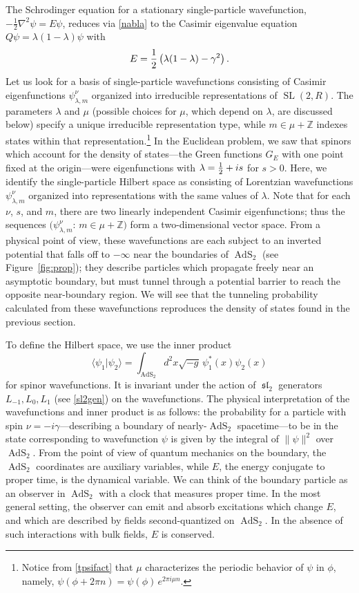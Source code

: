 \documentclass[11pt]{article}
\newcommand{\be}{\begin{equation}}
\newcommand{\ee}{\end{equation}}
\newcommand{\lt}{\left}
\newcommand{\rt}{\right}
\newcommand{\blangle}{\bigl\langle}
\newcommand{\brangle}{\bigr\rangle}
\newcommand*{\bbraket}[2]{\blangle{#1}\big|{#2}\brangle}
\newcommand{\ZZ}{\mathbb{Z}}
\newcommand{\RR}{\mathbb{R}}
\DeclareMathOperator{\sL}{\mathfrak{sl}}
\DeclareMathOperator{\tSL}{\widetilde{\mathrm{SL}}}
\DeclareMathOperator{\tAdS}{\widetilde{AdS}}
\newcommand{\lam}{\lambda}
\newcommand{\ga}{\gamma}
\newcommand{\ov}{\over}
\def\widetilde#1{#1}%
\def\RR{R}
\begin{document}
The Schrodinger equation for a stationary single-particle wavefunction, $-\frac{1}{2}\nabla^2\psi=E\psi$, reduces via \eqref{nabla} to the Casimir eigenvalue equation $Q\psi=\lam(1-\lam)\psi$ with
\be \label{EQrel}
E={1 \ov 2}\lt(\lam(1-\lam)-\ga^2\rt).
\ee
Let us look for a basis of single-particle wavefunctions consisting of Casimir eigenfunctions $\psi^{\nu}_{\lam, m}$ organized into irreducible representations of $\tSL(2,\RR)$. The parameters $\lambda$ and $\mu$ (possible choices for $\mu$, which depend on $\lam$, are discussed below) specify a unique irreducible representation type, while $m \in \mu+\ZZ$ indexes states within that representation.\footnote{Notice from \eqref{tpsifact} that $\mu$ characterizes the periodic behavior of $\psi$ in $\phi$, namely, $\psi(\phi+2\pi n)=\psi(\phi)\,e^{2\pi i\mu n}$.} In the Euclidean problem, we saw that spinors which account for the density of states---the Green functions $G_E$ with one point fixed at the origin---were eigenfunctions with $\lambda={1 \ov 2}+is$ for $s>0$. Here, we identify the single-particle Hilbert space as consisting of Lorentzian wavefunctions $\psi^{\nu}_{\lam, m}$ organized into representations with the same values of $\lam$. Note that for each $\nu$, $s$, and $m$, there are two linearly independent Casimir eigenfunctions; thus the sequences $\bigl(\psi^{\nu}_{\lam,m}:\, m\in\mu+\ZZ\bigr)$ form a two-dimensional vector space. From a physical point of view, these wavefunctions are each subject to an inverted potential that falls off to $-\infty$ near the boundaries of $\tAdS_2$ (see Figure~\ref{fig:prop}); they describe particles which propagate freely near an asymptotic boundary, but must tunnel through a potential barrier to reach the opposite near-boundary region. We will see that the tunneling probability calculated from these wavefunctions reproduces the density of states found in the previous section.

To define the Hilbert space, we use the inner product 
\begin{equation} \label{innprod}
\bbraket{\psi_1} {\psi_2}=\int_{\tAdS_2} d^2 x \sqrt{-g}\,\psi_1^*(x) \psi_2(x)
\end{equation}
for spinor wavefunctions. It is invariant under the action of $\sL_2$ generators $L_{-1}, L_{0}, L_{1}$ (see \eqref{sl2gen}) on the wavefunctions. The physical interpretation of the wavefunctions and inner product is as follows: the probability for a particle with spin $\nu=-i \ga$---describing a boundary of nearly-$\tAdS_2$ spacetime---to be in the state corresponding to wavefunction $\psi$ is given by the integral of $\|\psi\|^2$ over $\tAdS_2$. From the point of view of quantum mechanics on the boundary, the $\tAdS_2$ coordinates are auxiliary variables, while $E$, the energy conjugate to proper time, is the dynamical variable. We can think of the boundary particle as an observer in $\tAdS_2$ with a clock that measures proper time. In the most general setting, the observer can emit and absorb excitations which change $E$, and which are described by fields second-quantized on $\tAdS_2$. In the absence of such interactions with bulk fields, $E$ is conserved.
\end{document}
